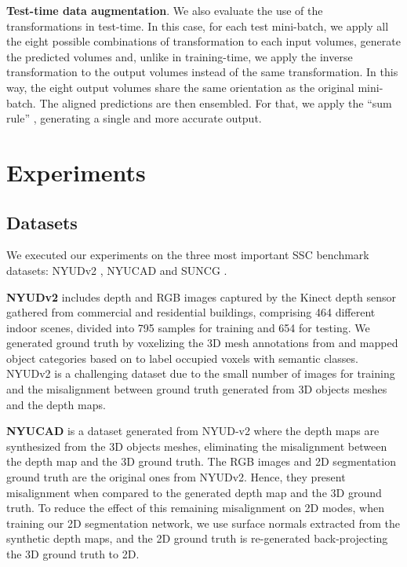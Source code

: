 \textbf{Test-time data augmentation}. We also evaluate the use of the transformations in test-time. In this case, for each test mini-batch, we apply all the eight possible combinations of transformation to each input volumes, generate the predicted volumes and, unlike in training-time, we apply the inverse transformation to the output volumes instead of the same transformation. In this way, the eight output volumes share the same orientation as the original mini-batch. The aligned predictions are then ensembled. For that, we apply the ``sum rule'' \cite{Kittler_1998}, generating a single and more accurate output. 


\section{Experiments}

\subsection{Datasets}

We executed our experiments on the three most important SSC benchmark datasets: NYUDv2 \cite{silberman_2012}, NYUCAD \cite{firman_2016} and SUNCG \cite{song_semantic_2017}.

\textbf{NYUDv2} includes depth and RGB images captured by the Kinect depth sensor gathered from commercial and residential buildings, comprising 464 different indoor scenes, divided into 795 samples for training and 654 for testing. We generated ground truth by voxelizing the 3D mesh annotations from \cite{Guo2015} and mapped object categories based on \cite{Handa2015} to label occupied voxels with semantic classes. NYUDv2 is a challenging dataset due to the small number of images for training and the misalignment between ground truth generated from 3D objects meshes and the depth maps.


\textbf{NYUCAD} is a dataset generated from NYUD-v2 where the depth maps are synthesized from the 3D objects meshes, eliminating the misalignment between the depth map and the 3D ground truth. The RGB images and 2D segmentation ground truth are the original ones from NYUDv2. Hence, they present misalignment when compared to the generated depth map and the 3D ground truth. To reduce the effect of this remaining misalignment on 2D modes, when training our 2D segmentation network, we use surface normals extracted from the synthetic depth maps, and the 2D ground truth is re-generated back-projecting the 3D ground truth to 2D. 


